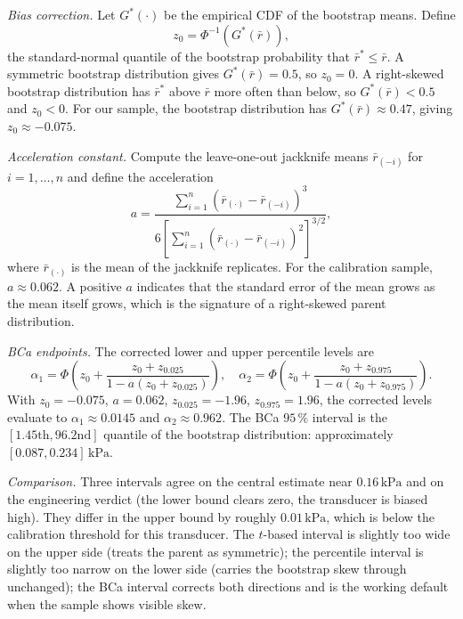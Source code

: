 \textit{Bias correction.} Let $G^{*}(\cdot)$ be the empirical CDF
of the bootstrap means. Define
\[
z_{0} = \Phi^{-1}\!\left(G^{*}(\bar{r})\right),
\]
the standard-normal quantile of the bootstrap probability that
$\bar{r}^{*} \leq \bar{r}$. A symmetric bootstrap distribution
gives $G^{*}(\bar{r}) = 0.5$, so $z_{0} = 0$. A right-skewed
bootstrap distribution has $\bar{r}^{*}$ above $\bar{r}$ more often
than below, so $G^{*}(\bar{r}) < 0.5$ and $z_{0} < 0$. For our
sample, the bootstrap distribution has $G^{*}(\bar{r}) \approx 0.47$,
giving $z_{0} \approx -0.075$.

\textit{Acceleration constant.} Compute the leave-one-out
jackknife means $\bar{r}_{(-i)}$ for $i = 1, \ldots, n$ and define
the acceleration
\[
a = \frac{\sum_{i=1}^{n} (\bar{r}_{(\cdot)} - \bar{r}_{(-i)})^{3}}
{6 \left[\sum_{i=1}^{n} (\bar{r}_{(\cdot)} - \bar{r}_{(-i)})^{2}
\right]^{3/2}},
\]
where $\bar{r}_{(\cdot)}$ is the mean of the jackknife replicates.
For the calibration sample, $a \approx 0.062$. A positive $a$
indicates that the standard error of the mean grows as the mean
itself grows, which is the signature of a right-skewed parent
distribution.

\textit{BCa endpoints.} The corrected lower and upper percentile
levels are
\[
\alpha_{1} = \Phi\!\left(z_{0} + \frac{z_{0} + z_{0.025}}
{1 - a(z_{0} + z_{0.025})}\right),
\quad
\alpha_{2} = \Phi\!\left(z_{0} + \frac{z_{0} + z_{0.975}}
{1 - a(z_{0} + z_{0.975})}\right).
\]
With $z_{0} = -0.075$, $a = 0.062$, $z_{0.025} = -1.96$,
$z_{0.975} = 1.96$, the corrected levels evaluate to
$\alpha_{1} \approx 0.0145$ and $\alpha_{2} \approx 0.962$. The BCa
$95 \,\%$ interval is the $[1.45 \text{th}, 96.2 \text{nd}]$
quantile of the bootstrap distribution: approximately
$[0.087, 0.234] \,\si{\kilo\pascal}$.

\textit{Comparison.} Three intervals agree on the central
estimate near $0.16 \,\si{\kilo\pascal}$ and on the engineering
verdict (the lower bound clears zero, the transducer is biased
high). They differ in the upper bound by roughly
$0.01 \,\si{\kilo\pascal}$, which is below the calibration
threshold for this transducer. The $t$-based interval is slightly
too wide on the upper side (treats the parent as symmetric); the
percentile interval is slightly too narrow on the lower side
(carries the bootstrap skew through unchanged); the BCa interval
corrects both directions and is the working default when the
sample shows visible skew.

